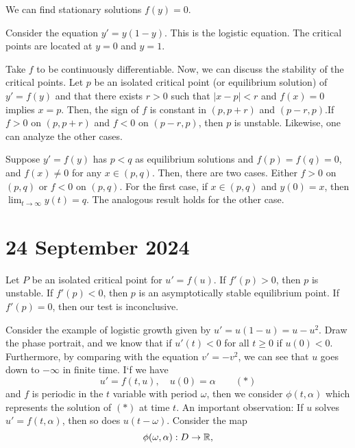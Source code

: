 \documentclass{article}
\begin{document}
We can find stationary solutions $f(y) = 0$. 
\begin{example}
    Consider the equation $y' = y(1 - y)$. This is the logistic equation. The critical points are located at $y = 0$ and $y = 1$. 
    \newpar 

    Take $f$ to be continuously differentiable. Now, we can discuss the stability of the critical points. Let $p$ be an isolated critical point (or equilibrium solution) of $y' = f(y)$ and that there exists $r > 0$ such that $| x - p | < r$ and $f(x) = 0$ implies $x = p$. Then, the sign of $f$ is constant in $(p, p+r)$ and $(p-r, p)$.If $ f > 0$ on $(p, p + r)$  and $f < 0$ on $(p - r, p)$, then $p$ is unstable. Likewise, one can analyze the other cases.  
\end{example}

\begin{theorem}[Claim.]{}
    Suppose $y' = f(y)$ has $p < q$ as equilibrium solutions and $f(p) = f(q) = 0$, and $f(x) \neq 0$ for any $x \in (p, q)$. Then, there are two cases. Either $f > 0$ on $(p, q)$ or $f < 0$ on $(p, q)$. For the first case, if $x \in (p, q)$ and $y(0) = x$, then $\lim_{t \to \infty} y(t) = q$. The analogous result holds for the other case. 
\end{theorem}

\section*{24 September 2024}
\begin{theorem}{}
    Let $P$ be an isolated critical point for $u' = f(u)$. If $f'(p) > 0$, then $p$ is unstable. If $f'(p) < 0$, then $p$ is an asymptotically stable equilibrium point. If $f'(p) = 0$, then our test is inconclusive. 
\end{theorem}

Consider the example of logistic growth given by $u' = u(1-u) = u - u^2$. Draw the phase portrait, and we know that if $u'(t) < 0$ for all $t \geq 0$ if $u(0) < 0$. Furthermore, by comparing with the equation $v' = -v^2$, we can see that $u$ goes down to $-\infty$ in finite time. 
\newpar
I`f we have 
    \[
        u' = f(t, u), \quad u(0) = \alpha \qquad(*)
    \]
    and $f$ is periodic in the $t$ variable with period $\omega$, then we consider $\phi(t, \alpha)$ which represents the solution of $(*)$ at time $t$. An important observation: If $u$ solves $u' = f(t, \alpha)$, then so does $u(t - \omega)$. Consider the map 
    \[
        \phi(\omega, \alpha) : D \to \mathbb{R},
    \]
\end{document}
